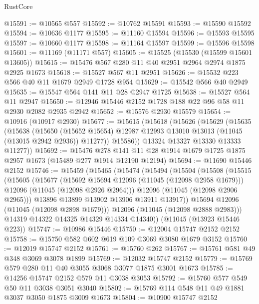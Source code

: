 \begin{lexlean}{RustCore}
\begin{coremodule}
@15591 := @10565 @557
@15592 := @10762 @15591
@15593 := @15590 @15592
@15594 := @10636 @1177
@15595 := @11160 @15594
@15596 := @15593 @15595
@15597 := @10660 @1177
@15598 := @11164 @15597
@15599 := @15596 @15598
@15601 := @11169 (@11171 @557)
@15605 := @15525 (@15530 (@15599 @15601 @13605))
@15615 := @15476 @567 @280 @11 @40 @2951 @2964 @2974 @1875 @2925 @1673
@15618 := @15527 @567 @11 @2951
@15626 := @15532 @223 @566 @40 @11 @1679 @2949 @1728 @954
@15629 := @15542 @566 @40 @2949
@15635 := @15547 @564 @141 @11 @28 @2947 @1725
@15638 := @15527 @564 @11 @2947
@15650 := @12946 @15446 @2152 @1728 @188 @22 @96 @58 @11 @2930 @2082 @2935 @2942
@15652 := @15576 @2930 @15579
@15654 := @10916 (@10917 @2930)
@15677 := @15615
    (@15618
      (@15626
        (@15629
          (@15635
            (@15638
              (@15650
                (@15652 @15654)
                @12987
                @12993
                @13010
                @13013
                (@11045 (@13015 @2942 @2936))
                @11277))
            @15586))
        @13324
        @13327
        @13330
        @13333
        @11277))
@15692 := @15476
    @278
    @141
    @11
    @28
    @1914
    @1679
    @1725
    @1875
    @2957
    @1673
    (@15489 @277 @1914 @12190 @12194)
@15694 := @11690 @15446 @2152
@15746 := @15459
    (@15465
      (@15474
        (@15494
          (@15504
            (@15508
              (@15515
                (@15605
                  (@15677
                    (@15692 @15694 @12096 (@11045 (@12098 @2958 @1679)))
                    @12096
                    (@11045 (@12098 @2926 @2964)))
                  @12096
                  (@11045 (@12098 @2906 @2965)))
                @13896
                @13899
                @13902
                @13906
                @13911
                @13917))
            @15694
            @12096
            (@11045 (@12098 @2898 @1679)))
          @12096
          (@11045 (@12098 @2888 @2983)))
        @14319
        @14322
        @14325
        @14329
        @14334
        @14340))
    (@11045 (@13923 @15446 @223))
@15747 := @10986 @15446
@15750 := @12004 @15747 @2152 @2152
@15758 := @15750 @582 @602 @619 @109 @3069 @3080 @1679 @3152
@15760 := @12019 @15747 @2152
@15761 := @15760 @262
@15767 := @15761 @581 @49 @348 @3069 @3078 @1899
@15769 := @12032 @15747 @2152
@15779 := @15769 @579 @280 @11 @40 @3055 @3068 @3077 @1875 @3001 @1673
@15785 := @14256 @15747 @2152 @579 @11 @3038 @3053
@15792 := @15760 @577 @549 @50 @11 @3038 @3051 @3040
@15802 := @15769 @114 @548 @11 @49 @1881 @3037 @3050 @1875 @3009 @1673
@15804 := @10900 @15747 @2152

\end{coremodule}
\end{lexlean}
